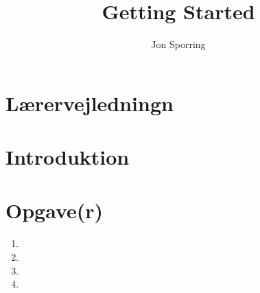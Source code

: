 \documentclass[a4paper,12pt]{article}
\title{Getting Started}
\author{Jon Sporring}
\begin{document}
\maketitle

\section{Lærervejledningn}

\section{Introduktion}

\section{Opgave(r)}
\begin{enumerate}
\item 
\item 
\item 
\item 
\end{enumerate}
\end{document}
